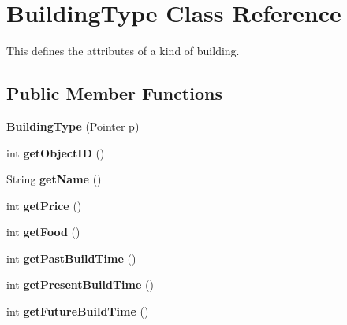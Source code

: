 \hypertarget{classBuildingType}{
\section{BuildingType Class Reference}
\label{classBuildingType}
}
This defines the attributes of a kind of building.  


\subsection*{Public Member Functions}
\begin{CompactItemize}
\item 
\hypertarget{classBuildingType_1e72b30a73d2105295e5156503ce6d0e}{
\textbf{BuildingType} (Pointer p)}
\label{classBuildingType_1e72b30a73d2105295e5156503ce6d0e}

\item 
\hypertarget{classBuildingType_8c86ddb95e6bc13487827ded4dc621c3}{
int \textbf{getObjectID} ()}
\label{classBuildingType_8c86ddb95e6bc13487827ded4dc621c3}

\item 
\hypertarget{classBuildingType_c3777a93871e57ff9ac7b7bede92fead}{
String \textbf{getName} ()}
\label{classBuildingType_c3777a93871e57ff9ac7b7bede92fead}

\item 
\hypertarget{classBuildingType_d15469dbd0ccc45cf5a44b1499b6c792}{
int \textbf{getPrice} ()}
\label{classBuildingType_d15469dbd0ccc45cf5a44b1499b6c792}

\item 
\hypertarget{classBuildingType_36523ba78f6ea88c1c90cc9435aff038}{
int \textbf{getFood} ()}
\label{classBuildingType_36523ba78f6ea88c1c90cc9435aff038}

\item 
\hypertarget{classBuildingType_6c1d19fb4d755d694887a17ed907a2cb}{
int \textbf{getPastBuildTime} ()}
\label{classBuildingType_6c1d19fb4d755d694887a17ed907a2cb}

\item 
\hypertarget{classBuildingType_ffcb8b32f1fd968a0eaf0759ddf84a43}{
int \textbf{getPresentBuildTime} ()}
\label{classBuildingType_ffcb8b32f1fd968a0eaf0759ddf84a43}

\item 
\hypertarget{classBuildingType_e4795590e00127be19258af35dfa5bc0}{
int \textbf{getFutureBuildTime} ()}
\label{classBuildingType_e4795590e00127be19258af35dfa5bc0}


\end{CompactItemize}
